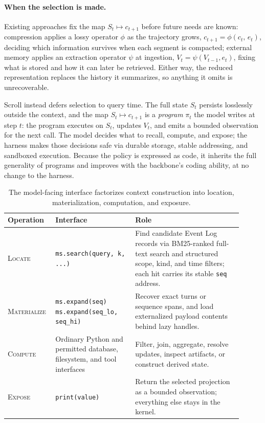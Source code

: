 \paragraph{When the selection is made.}
Existing approaches fix the map $S_t \mapsto c_{t+1}$ before future needs are known: compression applies a lossy operator $\phi$ as the trajectory grows, $c_{t+1} = \phi(c_t,\, e_{t})$, deciding which information survives when each segment is compacted; external memory applies an extraction operator $\psi$ at ingestion, $V_{t} = \psi(V_{t-1}, e_{t})$, fixing what is stored and how it can later be retrieved. Either way, the reduced representation replaces the history it summarizes, so anything it omits is unrecoverable.

Scroll instead defers selection to query time. The full state $S_t$ persists losslessly outside the context, and the map $S_t \mapsto c_{t+1}$ is a \emph{program} $\pi_t$ the model writes at step $t$: the program executes on $S_t$, updates $V_t$, and emits a bounded observation for the next call. The model decides what to recall, compute, and expose; the harness makes those decisions safe via durable storage, stable addressing, and sandboxed execution.  Because the policy is expressed as code, it inherits the full generality of programs and improves with the backbone's coding ability, at no change to the harness.




\begin{table}[t]
\centering
\footnotesize
\begin{tabular}{@{}p{0.16\linewidth}p{0.32\linewidth}p{0.43\linewidth}@{}}
\toprule
\textbf{Operation} & \textbf{Interface} & \textbf{Role} \\
\midrule
\textsc{Locate}
&
\texttt{ms.search(query, k, ...)}
&
Find candidate Event Log records via BM25-ranked full-text search and
structured scope, kind, and time filters; each hit carries its stable
\texttt{seq} address.\\
\textsc{Materialize}
&
\texttt{ms.expand(seq)} \newline
\texttt{ms.expand(seq\_lo, seq\_hi)}
&
Recover exact turns or sequence spans, and load externalized payload
contents behind lazy handles. \\
\textsc{Compute}
&
Ordinary Python and permitted database, filesystem, and tool interfaces
&
Filter, join, aggregate, resolve updates, inspect artifacts, or construct
derived state. \\
\textsc{Expose}
&
\texttt{print(value)}
&
Return the selected projection as a bounded observation; everything else
stays in the kernel. \\
\bottomrule
\end{tabular}
\caption{The model-facing interface factorizes context construction into
location, materialization, computation, and exposure.}
\label{tab:memory-surface}
\end{table}



